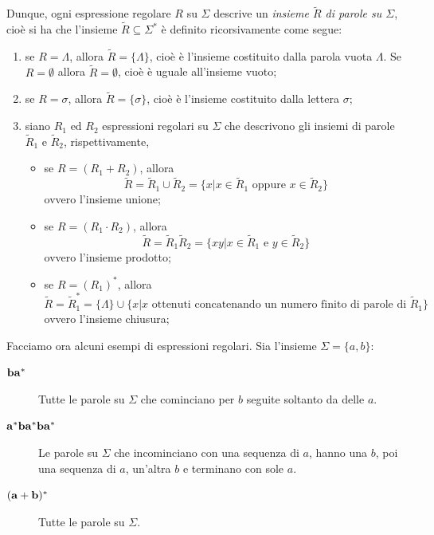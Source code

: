 \documentclass[10pt]{\classname}
\theoremstyle{definition}
\theoremstyle{definition}
\begin{document}
Dunque, ogni espressione regolare $R$ su $\Sigma$ descrive un \emph{insieme
$\tilde{R}$ di parole su $\Sigma$}, cioè si ha che l'insieme $\tilde{R}\subseteq
\Sigma^*$ è definito ricorsivamente come segue:
\begin{enumerate}
    \item se $R = \Lambda$, allora $\tilde R = \{\Lambda\}$, cioè è l'insieme
        costituito dalla parola vuota $\Lambda$. Se $R = \emptyset$ allora
        $\tilde R = \emptyset$, cioè è uguale all'insieme vuoto;
    \item se $R = \sigma$, allora $\tilde R = \{ \sigma \}$, cioè è l'insieme costituito dalla lettera $\sigma$;
    \item siano $R_1$ ed $R_2$ espressioni regolari su $\Sigma$ che descrivono gli insiemi di parole $\tilde R_1$ e $\tilde R_2$, rispettivamente,
\begin{itemize}
    \item se $R = (R_1 + R_2)$, allora $$\tilde R = \tilde R_1 \cup \tilde R_2
        = \{x | x \in \tilde R_1 \mbox{ oppure } x \in \tilde R_2\}$$ ovvero
        l'insieme unione;
    \item se $R = (R_1 \cdot R_2)$, allora $$\tilde R = \tilde R_1 \tilde R_2 =
        \{xy | x \in \tilde R_1 \mbox{ e } y \in \tilde R_2\}$$ ovvero
        l'insieme prodotto;
    \item se $R = (R_1)^*$, allora $$\tilde R = \tilde R_1^* =
        \{\Lambda\} \cup \{x | x \mbox{ ottenuti concatenando un numero finito
        di parole di } \tilde R_1\}$$ ovvero l'insieme chiusura;
\end{itemize}
\end{enumerate}

Facciamo ora alcuni esempi di espressioni regolari. Sia l'insieme $\Sigma = \{a,b\}$:
\begin{description}
    \item[$\bf ba^*$] Tutte le parole su $\Sigma$ che cominciano per $b$ seguite
        soltanto da delle $a$.
    \item[$\bf a^*ba^*ba^*$] Le parole su $\Sigma$ che incominciano con una sequenza di $a$,
        hanno una $b$, poi una sequenza di $a$, un'altra $b$ e terminano con
        sole $a$.
    \item[$\bf (a+b)^*$] Tutte le parole su $\Sigma$.
\end{description}
\end{document}
